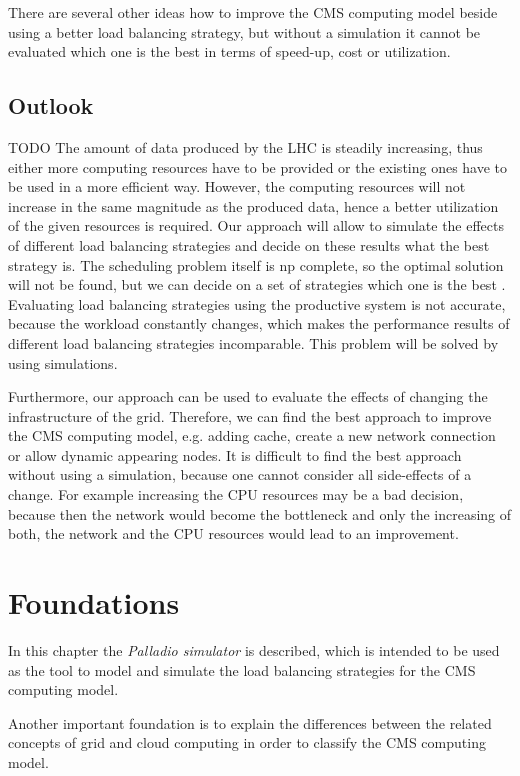 There are several other ideas how to improve the CMS computing model beside using a better load balancing strategy, but without a simulation it cannot be evaluated which one is the best in terms of speed-up, cost or utilization.
\newpage

\section{Outlook} TODO 
The amount of data produced by the LHC is steadily increasing, thus either more computing resources have to be provided or the existing ones have to be used in a more efficient way.
However, the computing resources will not increase in the same magnitude as the produced data, hence a better utilization of the given resources is required. Our approach will allow to simulate the effects of different load balancing strategies and decide on these results what the best strategy is. The scheduling problem itself is np complete, so the optimal solution will not be found, but we can decide on a set of strategies which one is the best \cite{1698650}. Evaluating load balancing strategies using the productive system is not accurate, because the workload constantly changes, which makes the performance results of different load balancing strategies incomparable. This problem will be solved by using simulations.

Furthermore, our approach can be used to evaluate the effects of changing the infrastructure of the grid. Therefore, we can find the best approach to improve the CMS computing model, e.g. adding cache, create a new network connection or allow dynamic appearing nodes.
It is difficult to find the best approach without using a simulation, because one cannot consider all side-effects of a change. For example increasing the CPU resources may be a bad decision, because then the network would become the bottleneck and only the increasing of both, the network and the CPU resources would lead to an improvement.

\chapter {Foundations}
In this chapter the \textit{Palladio simulator} is described, which is intended to be used as the tool to model and simulate the load balancing strategies for the CMS computing model.

Another important foundation is to explain the differences between the related concepts of grid and cloud computing in order to classify the CMS computing model.


